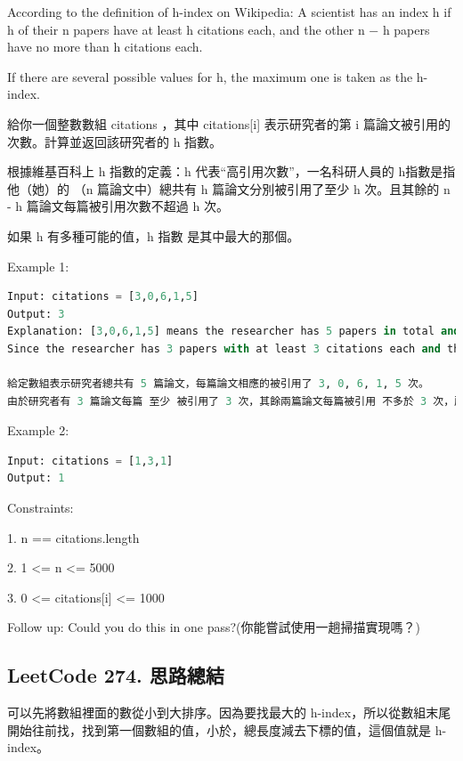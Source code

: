 \documentclass[10pt,UTF8]{ctexart}
\begin{document}
According to the definition of h-index on Wikipedia: A scientist has an index h if h of their n papers have at least h citations each, and the other n − h papers have no more than h citations each.

If there are several possible values for h, the maximum one is taken as the h-index.

給你一個整數數組 citations ，其中 citations[i] 表示研究者的第 i 篇論文被引用的次數。計算並返回該研究者的 h 指數。

根據維基百科上 h 指數的定義：h 代表“高引用次數”，一名科研人員的 h指數是指他（她）的 （n 篇論文中）總共有 h 篇論文分別被引用了至少 h 次。且其餘的 n - h 篇論文每篇被引用次數不超過 h 次。

如果 h 有多種可能的值，h 指數 是其中最大的那個。

Example 1:

\begin{lstlisting}[language={python}]
Input: citations = [3,0,6,1,5]
Output: 3
Explanation: [3,0,6,1,5] means the researcher has 5 papers in total and each of them had received 3, 0, 6, 1, 5 citations respectively.
Since the researcher has 3 papers with at least 3 citations each and the remaining two with no more than 3 citations each, their h-index is 3.

給定數組表示研究者總共有 5 篇論文，每篇論文相應的被引用了 3, 0, 6, 1, 5 次。
由於研究者有 3 篇論文每篇 至少 被引用了 3 次，其餘兩篇論文每篇被引用 不多於 3 次，所以她的 h 指數是 3。
\end{lstlisting}

Example 2:
\begin{lstlisting}[language={python}]
Input: citations = [1,3,1]
Output: 1
\end{lstlisting}

Constraints:

1. n == citations.length

2. 1 <= n <= 5000

3. 0 <= citations[i] <= 1000

Follow up: Could you do this in one pass?(你能嘗試使用一趟掃描實現嗎？)

\subsection{LeetCode 274. 思路總結}

可以先將數組裡面的數從小到大排序。因為要找最大的 h-index，所以從數組末尾開始往前找，找到第一個數組的值，小於，總長度減去下標的值，這個值就是 h-index。
\end{document}
